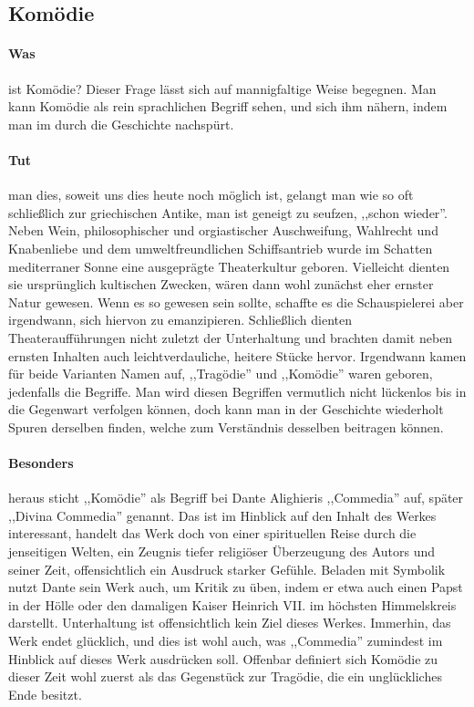 \subsection{Komödie}

\paragraph{Was}
ist Komödie? 
Dieser Frage lässt sich auf mannigfaltige Weise begegnen.
Man kann Komödie als rein sprachlichen Begriff sehen, und sich ihm nähern, indem man im durch die Geschichte nachspürt.
\paragraph{Tut}
man dies, soweit uns dies heute noch möglich ist, gelangt man wie so oft schließlich zur griechischen Antike, man ist geneigt zu seufzen, ,,schon wieder''.
Neben Wein, philosophischer und orgiastischer Auschweifung, Wahlrecht und Knabenliebe und dem umweltfreundlichen Schiffsantrieb wurde im Schatten mediterraner Sonne eine ausgeprägte Theaterkultur geboren. 
Vielleicht dienten sie ursprünglich kultischen Zwecken, wären dann wohl zunächst eher ernster Natur gewesen. 
Wenn es so gewesen sein sollte, schaffte es die Schauspielerei aber irgendwann, sich hiervon zu emanzipieren. 
Schließlich dienten Theateraufführungen nicht zuletzt der Unterhaltung und brachten damit neben ernsten Inhalten auch leichtverdauliche, heitere Stücke hervor.
Irgendwann kamen für beide Varianten Namen auf, ,,Tragödie'' und ,,Komödie'' waren geboren, jedenfalls die Begriffe.
Man wird diesen Begriffen vermutlich nicht lückenlos bis in die Gegenwart verfolgen können, doch kann man in der Geschichte wiederholt Spuren derselben finden, welche zum Verständnis desselben beitragen können.
\paragraph{Besonders}
heraus sticht ,,Komödie'' als Begriff bei Dante Alighieris ,,Commedia''  auf, später ,,Divina Commedia'' genannt.
Das ist im Hinblick auf den Inhalt des Werkes interessant, handelt das Werk doch von einer spirituellen Reise durch die jenseitigen Welten, ein Zeugnis tiefer religiöser Überzeugung des Autors und seiner Zeit, offensichtlich ein Ausdruck starker Gefühle.
Beladen mit Symbolik nutzt Dante sein Werk auch, um Kritik zu üben, indem er etwa auch einen Papst in der Hölle oder den damaligen Kaiser Heinrich VII. im höchsten Himmelskreis darstellt.
Unterhaltung ist offensichtlich kein Ziel dieses Werkes.
Immerhin, das Werk endet glücklich, und dies ist wohl auch, was ,,Commedia'' zumindest im Hinblick auf dieses Werk ausdrücken soll.
Offenbar definiert sich Komödie zu dieser Zeit wohl zuerst als das Gegenstück zur Tragödie, die ein unglückliches Ende besitzt.

